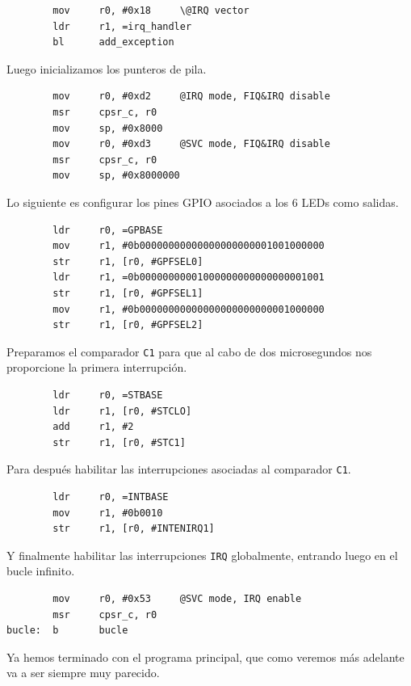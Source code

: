 \begin{lstlisting}
        mov     r0, #0x18     \@IRQ vector
        ldr     r1, =irq_handler
        bl      add_exception
\end{lstlisting}

Luego inicializamos los punteros de pila.

\begin{lstlisting}
        mov     r0, #0xd2     @IRQ mode, FIQ&IRQ disable
        msr     cpsr_c, r0
        mov     sp, #0x8000
        mov     r0, #0xd3     @SVC mode, FIQ&IRQ disable
        msr     cpsr_c, r0
        mov     sp, #0x8000000
\end{lstlisting}

Lo siguiente es configurar los pines GPIO asociados a los 6 LEDs como salidas.

\begin{lstlisting}
        ldr     r0, =GPBASE
        mov     r1, #0b00000000000000000000001001000000
        str     r1, [r0, #GPFSEL0]
        ldr     r1, =0b00000000001000000000000000001001
        str     r1, [r0, #GPFSEL1]
        mov     r1, #0b00000000000000000000000001000000
        str     r1, [r0, #GPFSEL2]
\end{lstlisting}

Preparamos el comparador {\tt C1} para que al cabo de dos microsegundos nos proporcione la primera
interrupción.

\begin{lstlisting}
        ldr     r0, =STBASE
        ldr     r1, [r0, #STCLO]
        add     r1, #2
        str     r1, [r0, #STC1]
\end{lstlisting}

Para después habilitar las interrupciones asociadas al comparador {\tt C1}.

\begin{lstlisting}
        ldr     r0, =INTBASE
        mov     r1, #0b0010
        str     r1, [r0, #INTENIRQ1]
\end{lstlisting}

Y finalmente habilitar las interrupciones {\tt IRQ} globalmente, entrando luego en
el bucle infinito.

\begin{lstlisting}
        mov     r0, #0x53     @SVC mode, IRQ enable
        msr     cpsr_c, r0
bucle:  b       bucle
\end{lstlisting}

Ya hemos terminado con el programa principal, que como veremos más adelante va a ser
siempre muy parecido.

